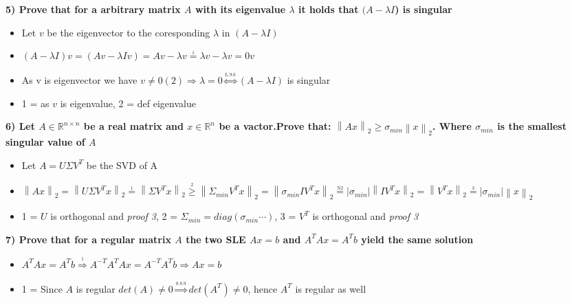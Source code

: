 \documentclass[7pt,landscape, margin = 0.1mm]{article}
\begin{document}
\begin{multicols}{4}
\begin{flushleft}
\textbf{5) Prove that for a arbitrary matrix $A$ with its eigenvalue $\lambda$ it holds that $(A - \lambda I $) is singular}
\begin{itemize}
\item[] Let $v$ be the eigenvector to the coresponding $\lambda $ in $(A - \lambda I )$
\item[] $(A - \lambda I )v = (Av - \lambda I v) = Av - \lambda v \overset{\underset{\mathrm{\text{1}}}{}}{=}  \lambda v - \lambda v = 0v$
\item[] As v is eigenvector we have $v \neq 0 (2) \Rightarrow \lambda = 0 \overset{\underset{\mathrm{L.9.6}}{}}{\Leftrightarrow} (A - \lambda I ) $ is singular
\item[] 1 = as $v$ is eigenvalue, 2 = def eigenvalue
\end{itemize}
\textbf{6) Let $A \in \mathbb{R}^{n \times n}$ be a real matrix and $x \in \mathbb{R}^n $ be a vactor.Prove that: $\left\|Ax \right\|_2 \geq \sigma_{min} \left\|x \right\|_2 $. Where $\sigma_{min} $ is the smallest singular value of $A$}
\begin{itemize}
\item[] Let $A = U \Sigma V^T$ be the SVD of A
\item[] $\left\| Ax \right\|_2 = \left\| U \Sigma V^T x \right\|_2 \overset{\underset{\mathrm{1}}{}}{=}\left\|  \Sigma V^T x \right\|_2 \overset{\underset{\mathrm{2}}{}}{\geq } \left\|  \Sigma_{min} V^T x \right\|_2 = \left\|  \sigma_{min} I V^T x \right\|_2  \overset{\underset{\mathrm{N2}}{}}{=} |\sigma_{min}| \left\| I V^T x \right\|_2 = \left\|  V^T x \right\|_2 \overset{\underset{\mathrm{3}}{}}{=} |\sigma_{min}| \left\| x \right\|_2 $
\item[] 1 = $U$ is orthogonal and \textit{proof 3}, 2 = $\Sigma_{min} = diag(\sigma_{min} \cdots) $, 3 = $V^T$ is orthogonal and \textit{proof 3}
\end{itemize}

\textbf{7) Prove that for a regular matrix $A$ the two SLE $Ax=b $ and $A^T Ax=A^Tb $ yield the same solution}
\begin{itemize}
\item[] $A^T Ax=A^Tb \overset{\underset{\mathrm{1}}{}}{\Rightarrow } A^{-T}A^T Ax=A^{-T}A^Tb \overset{\underset{\mathrm{}}{}}{\Rightarrow } Ax = b $
\item[] 1 = Since $A$ is regular $det(A) \neq 0 \overset{\underset{\mathrm{S.8.9}}{}}{\Rightarrow } det(A^T) \neq 0$, hence $ A^T$ is regular as well  
\end{itemize}



\end{flushleft}
\end{multicols}
\end{document}
